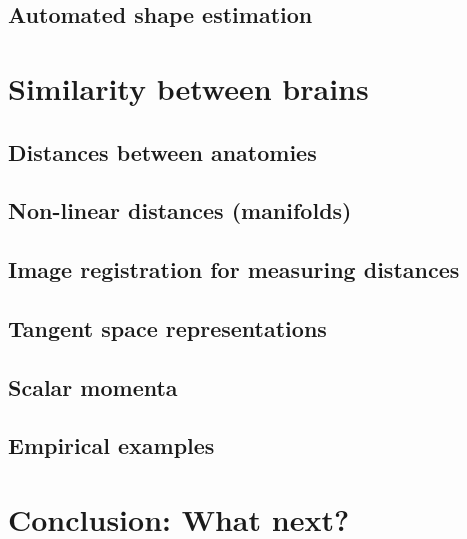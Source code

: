 \documentclass{beamer}
\begin{document}
    \subsection{Automated shape estimation}                       

\section{Similarity between brains}
    \subsection{Distances between anatomies}                      
    \subsection{Non-linear distances (manifolds)}                 
    \subsection{Image registration for measuring distances}       
    \subsection{Tangent space representations}                    
    \subsection{Scalar momenta}                                   
    \subsection{Empirical examples}                               

\section{Conclusion: What next?}
                                                                  
\end{document}
